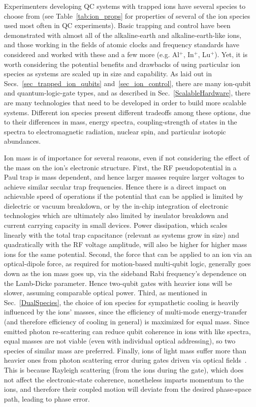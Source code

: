 \documentclass[%
reprint,
 amsmath,amssymb,
]{revtex4-1}
\begin{document}
Experimenters developing QC systems with trapped ions have several species to choose from (see Table~\ref{tab:ion_props} for properties of several of the ion species used most often in QC experiments).  Basic trapping and control have been demonstrated with almost all of the alkaline-earth and alkaline-earth-like ions, and those working in the fields of atomic clocks and frequency standards have considered and worked with these and a few more (e.g. Al$^{+}$, In$^{+}$, Lu$^{+}$). Yet, it is worth considering the potential benefits and drawbacks of using particular ion species as systems are scaled up in size and capability.  As laid out in Secs.~\ref{sec_trapped_ion_qubits} and~\ref{sec_ion_control}, there are many ion-qubit and quantum-logic-gate types, and as described in Sec.~\ref{ScalableHardware}, there are many technologies that need to be developed in order to build more scalable systems.  Different ion species present different tradeoffs among these options, due to their differences in mass, energy spectra, coupling-strength of states in the spectra to electromagnetic radiation, nuclear spin, and particular isotopic abundances.

Ion mass is of importance for several reasons, even if not considering the effect of the mass on the ion's electronic structure.  First, the RF pseudopotential in a Paul trap is mass dependent, and hence larger masses require larger voltages to achieve similar secular trap frequencies.  Hence there is a direct impact on achievable speed of operations if the potential that can be applied is limited by dielectric or vacuum breakdown, or by the in-chip integration of electronic technologies which are ultimately also limited by insulator breakdown and current carrying capacity in small devices.  Power dissipation, which scales linearly with the total trap capacitance (relevant as systems grow in size) and quadratically with the RF voltage amplitude, will also be higher for higher mass ions for the same potential.  Second, the force that can be applied to an ion via an optical-dipole force, as required for motion-based multi-qubit logic, generally goes down as the ion mass goes up, via the sideband Rabi frequency's dependence on the Lamb-Dicke parameter.  Hence two-qubit gates with heavier ions will be slower, assuming comparable optical power.  Third, as mentioned in Sec.~\ref{DualSpecies}, the choice of ion species for sympathetic cooling is heavily influenced by the ions' masses, since the efficiency of multi-mode energy-transfer (and therefore efficiency of cooling in general) is maximized for equal mass.  Since emitted photon re-scattering can reduce qubit coherence in ions with like spectra, equal masses are not viable (even with individual optical addressing), so two species of similar mass are preferred.  Finally, ions of light mass suffer more than heavier ones from photon scattering error during gates driven via optical fields~\cite{PhysRevA.75.042329_2007}.  This is because Rayleigh scattering (from the ions during the gate), which does not affect the electronic-state coherence, nonetheless imparts momentum to the ions, and therefore their coupled motion will deviate from the desired phase-space path, leading to phase error.
\end{document}
